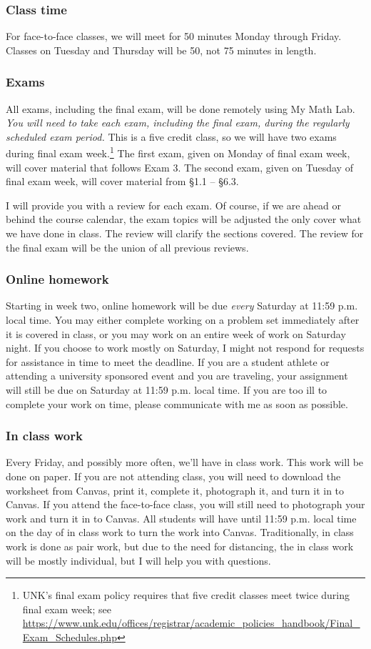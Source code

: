 \documentclass[12pt]{article}
\newcounter{ex}\setcounter{ex}{0}
\begin{document}
\subsubsection*{Class time}  For face-to-face classes, we will meet for 50 minutes 
Monday through Friday.  Classes on Tuesday and Thursday will be 50, not 75 minutes 
in length. 



\subsubsection*{Exams} All exams, including the final exam, will be done remotely using My Math Lab. \emph{You will need to take each exam, including the final exam,  during the regularly scheduled exam period.} This is a five credit class, so we will have two exams during final exam week.\footnote{UNK's final exam policy requires that five credit classes meet twice during final exam week; see
\url{https://www.unk.edu/offices/registrar/academic_policies_handbook/Final_Exam_Schedules.php}}  The first exam, given on Monday of final exam week, will cover material that follows Exam 3.  The second exam, given on Tuesday of final exam week, will cover material from \S1.1 -- \S6.3.

I will provide you with a review for each exam.  Of course, if we are ahead or behind the course calendar,  the exam topics will be adjusted the only cover what we have done in class. The review will clarify the sections covered. The review for the final exam will be the union of all previous reviews.

\subsubsection*{Online homework} Starting in week two, online homework will be due \emph{every} Saturday at 11:59 p.m. local time.  You may either complete working on a problem set immediately after it is covered in class, or you may work on an entire week of work on Saturday night. If you choose to work mostly on Saturday, I might not respond for requests for assistance in time to meet the deadline. If you are a student athlete or attending a university sponsored event and you are traveling, your assignment will still be due on  Saturday at 11:59 p.m. local time.  If you are too ill to complete your work on time, please communicate with me as soon as possible.


\subsubsection*{In class work} Every Friday, and possibly more often, we'll have in class work. This work will be done on paper. If you are not attending class, you will need to download the worksheet from Canvas, print it, complete it, photograph it, and turn it in to Canvas. If you attend the face-to-face class, you will still need to photograph your work and turn it in to Canvas. All students will have until 11:59 p.m. local time on the day of in class work to turn the work into Canvas. Traditionally, in class work is done as pair work, but due to the need for distancing, the in class work will be mostly individual, but I will help you with questions.
\end{document}
